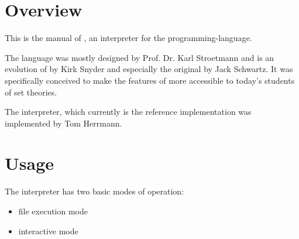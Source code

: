 \def\myDocumentTypeArticle{-}


\globalDate{\today}






\begin{titlepage}
\maketitle
\vfill
\tableofcontents
\end{titlepage}

\section{Overview}

This is the manual of \setlX, an interpreter for the \SetlX{} programming-language.

The \SetlX{} language was mostly designed by Prof. Dr. Karl Stroetmann and is an evolution of \SetlTwo{} by Kirk Snyder and especially the original \Setl{} by Jack Schwartz. It was specifically conceived to make the features of \Setl{} more accessible to today's students of set theories.

The \setlX{} interpreter, which currently is the \SetlX{} reference implementation was implemented by Tom Herrmann.

\section{Usage}

The \setlX{} interpreter has two basic modes of operation:
\begin{itemize}
	\item file execution mode
	\item interactive mode
\end{itemize}

